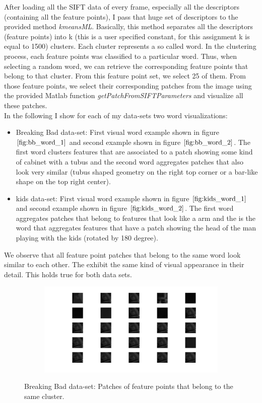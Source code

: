 \documentclass{paper}
\begin{document}
After loading all the SIFT data of every frame, especially all the descriptors (containing all the feature points), I pass that huge set of descriptors to the provided method \emph{kmeansML}. Basically, this method separates all the descriptors (feature points) into k (this is a user specified constant, for this assignment k is equal to 1500) clusters. Each cluster represents a so called word. In the clustering process, each feature points was classified to a particular word. Thus, when selecting a random word, we can retrieve the corresponding feature points that belong to that cluster. From this feature point set, we select 25 of them. From those feature points, we select their corresponding patches from the image using the provided Matlab function \emph{getPatchFromSIFTParameters} and visualize all these patches. \\

In the following I show for each of my data-sets two word visualizations:
\begin{itemize}
    \item Breaking Bad data-set: First visual word example shown in figure $\ref{fig:bb_word_1}$ and second example shown in figure $\ref{fig:bb_word_2}$. The first word clusters features that are associated to a patch showing some kind of cabinet with a tubus and the second word aggregates patches that also look very similar (tubus shaped geometry on the right top corner or a bar-like shape on the top right center).
    \item kids data-set: First visual word example shown in figure $\ref{fig:kids_word_1}$ and second example shown in figure $\ref{fig:kids_word_2}$. The first word aggregates patches that belong to features that look like a arm and the is the word that aggregates features that have a patch showing the head of the man playing with the kids (rotated by 180 degree).
\end{itemize}

We observe that all feature point patches that belong to the same word look similar to each other. The exhibit the same kind of visual appearance in their detail. This holds true for both data sets.


\begin{figure}[H]
\centering
\begin{subfigure}{1.0\textwidth}
\includegraphics[width=\textwidth]{figures/vocabulary/bb/bbVoca122}
\end{subfigure}
\caption{Breaking Bad data-set: Patches of feature points that belong to the same cluster.}
\label{fig:bb_word_1}
\end{figure}
\end{document}
